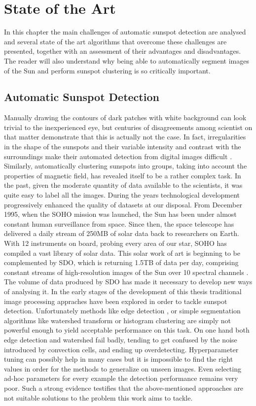 \chapter{State of the Art}
\label{capitolo3}
\thispagestyle{empty}

\noindent In this chapter the main challenges of automatic sunspot detection are analysed and several state of the art algorithms that overcome these challenges are presented, together with an assessment of their advantages and disadvantages. The reader will also understand why being able to automatically segment images of the Sun and perform sunspot clustering is so critically important.
\section{Automatic Sunspot Detection}
\noindent Manually drawing the contours of dark patches with white background can look trivial to the inexperienced eye, but centuries of disagreements among scientist on that matter demonstrate that this is actually not the case. In fact, irregularities in the shape of the sunspots and their variable intensity and contrast with the surroundings make their automated detection from digital images difficult \cite{curto2008automatic}. Similarly, automatically clustering sunspots into groups, taking into account the properties of magnetic field, has revealed itself to be a rather complex task.
\bigbreak
\noindent In the past, given the moderate quantity of data available to the scientists, it was quite easy to label all the images. During the years technological development progressively enhanced the quality of datasets at our disposal. From December 1995, when the SOHO mission was launched, the Sun has been under almost constant human surveillance from space. Since then, the space telescope has delivered a daily stream of 250MB of solar data back to researchers on Earth. With 12 instruments on board, probing every area of our star, SOHO has compiled a vast library of solar data. This solar work of art is beginning to be complemented by SDO, which is returning 1.5TB of data per day, comprising constant streams of high-resolution images of the Sun over 10 spectral channels \cite{esa-soho}. The volume of data produced by SDO has made it necessary to develop new ways of analysing it.
\bigbreak
\noindent In the early stages of the development of this thesis traditional image processing appraches have been explored in order to tackle sunspot detection. Unfortunately methods like edge detection \cite{canny1987computational}, or simple segmentation algorithms like watershed transform \cite{beucher1992watershed} or histogram clustering \cite{puzicha1999histogram} are simply not powerful enough to yield acceptable performance on this task. On one hand both edge detection and watershed fail badly, tending to get confused by the noise introduced by convection cells, and ending up overdetecting. Hyperparameter tuning can possibly help in many cases but it is impossible to find the right values in order for the methods to generalize on unseen images. Even selecting ad-hoc parameters for every example the detection performance remains very poor. Such a strong evidence testifies that the above-mentioned approaches are not suitable solutions to the problem this work aims to tackle.
